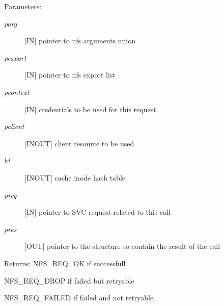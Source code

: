 \begin{Desc}
\item[Parameters:]
\begin{description}
\item[{\em parg}][IN] pointer to nfs arguments union \item[{\em pexport}][IN] pointer to nfs export list \item[{\em pcontext}][IN] credentials to be used for this request \item[{\em pclient}][INOUT] client resource to be used \item[{\em ht}][INOUT] cache inode hash table \item[{\em preq}][IN] pointer to SVC request related to this call \item[{\em pres}][OUT] pointer to the structure to contain the result of the call\end{description}
\end{Desc}
\begin{Desc}
\item[Returns:]NFS\_\-REQ\_\-OK if successfull \par
 NFS\_\-REQ\_\-DROP if failed but retryable \par
 NFS\_\-REQ\_\-FAILED if failed and not retryable. \end{Desc}
